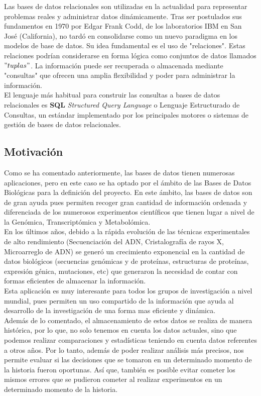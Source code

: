 \documentclass[12pt,a4paper]{article}
\begin{document}
Las bases de datos relacionales son utilizadas en la actualidad para representar problemas reales y administrar datos dinámicamente. Tras ser postulados sus fundamentos en 1970 por Edgar Frank Codd, de los laboratorios IBM en San José (California), no tardó en consolidarse como un nuevo paradigma en los modelos de base de datos. Su idea fundamental es el uso de "relaciones". Estas relaciones podrían considerarse en forma lógica como conjuntos de datos llamados $"tuplas"$. La información puede ser recuperada o almacenada mediante "consultas" que ofrecen una amplia flexibilidad y poder para administrar la información.\\
\newpage
El lenguaje más habitual para construir las consultas a bases de datos relacionales es \textbf{SQL} \textit{Structured Query Language} o Lenguaje Estructurado de Consultas, un estándar implementado por los principales motores o sistemas de gestión de bases de datos relacionales.


\subsection{Motivación} \label{pto12}

Como se ha comentado anteriormente, las bases de datos tienen numerosas aplicaciones, pero en este caso se ha optado por el ámbito de las Bases de Datos Biológicas para la definición del proyecto. En este ámbito, las bases de datos son de gran ayuda pues permiten recoger gran cantidad de información ordenada y diferenciada de los numerosos experimentos científicos que tienen lugar a nivel de la Genómica, Transcriptómica y Metabolómica.\\

En los últimos años, debido a la rápida evolución de las técnicas experimentales de alto rendimiento (Secuenciación del ADN, Cristalografía de rayos X, Microarreglo de ADN) se generó un crecimiento exponencial en la cantidad de datos biológicos (secuencias genómicas y de proteínas, estructuras de proteínas, expresión génica, mutaciones, etc) que generaron la necesidad de contar con formas eficientes de almacenar la información.\\

Esta aplicación es muy interesante para todos los grupos de investigación a nivel mundial, pues permiten un uso compartido de la información que ayuda al desarrollo de la investigación de una forma mas eficiente y dinámica.\\

Además de lo comentado, el almacenamiento de estos datos se realiza de manera histórica, por lo que, no solo tenemos en cuenta los datos actuales, sino que podemos realizar comparaciones y estadísticas teniendo en cuenta datos referentes a otros años. Por lo tanto, además de poder realizar análisis más precisos, nos permite evaluar si las decisiones que se tomaron en un determinado momento de la historia fueron oportunas. Así que, también es posible evitar cometer los mismos errores que se pudieron cometer al realizar experimentos en un determinado momento de la historia.\\
\end{document}
